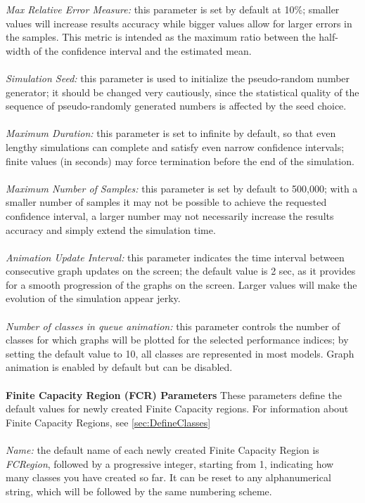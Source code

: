 \emph{Max Relative Error Measure:}
this parameter is set by default at 10\%; smaller values will increase results accuracy while bigger values allow for larger errors in the samples. This metric is intended as the maximum ratio between the half-width of the confidence interval and the estimated mean.\\\\
\emph{Simulation Seed:}
this parameter is used to initialize the pseudo-random number generator; it should be changed very cautiously, since the statistical quality of the sequence of pseudo-randomly generated numbers is affected by the seed choice.\\\\
\emph{Maximum Duration:}
this parameter is set to infinite by default, so that even lengthy simulations can complete and satisfy even narrow confidence intervals; finite values (in seconds) may force termination before the end of the simulation.\\\\
\emph{Maximum Number of Samples: }
this parameter is set by default to 500,000; with a smaller number of samples it may not be possible to achieve the requested confidence interval, a larger number may not necessarily increase the results accuracy and simply extend the simulation time.\\\\
\emph{Animation Update Interval:}
this parameter indicates the time interval between consecutive graph updates on the screen; the default value is 2 sec, as it provides for a smooth progression of the graphs on the screen. Larger values will make the evolution of the simulation appear jerky.\\\\
\emph{Number of classes in queue animation: }
this parameter controls the number of classes for which graphs will be plotted for the selected performance indices; by setting the default value to 10, all classes are represented in most models. Graph animation is enabled by default but can be disabled.\\\\
\textbf{Finite Capacity Region (FCR) Parameters}
These parameters define the default values for newly created Finite Capacity regions. For information about Finite Capacity Regions, see \autoref{sec:DefineClasses}\\\\
\emph{Name:}
the default name of each newly created Finite Capacity Region is \emph{FCRegion}, followed by a progressive integer, starting from 1, indicating how many classes you have created so far. It can be reset to any alphanumerical string, which will be followed by the same numbering scheme.\\\\

